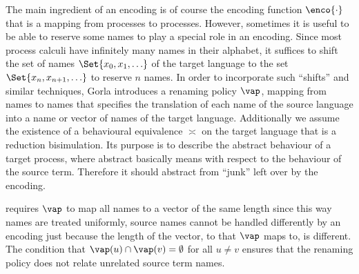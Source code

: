 \documentclass[final,copyright,creativecommons]{eptcs}
\begin{document}
The main ingredient of an encoding is of course the encoding function $ \enco{\cdot} $ that is a mapping from processes to processes.
However, sometimes it is useful to be able to reserve some names to play a special role in an encoding.
Since most process calculi have infinitely many names in their alphabet, it suffices to shift the set of names $ \Set{ x_0, x_1, \ldots } $ of the target language to the set $ \Set{ x_n, x_{n+1}, \ldots } $ to reserve $ n $ names. In order to incorporate such ``shifts'' and similar techniques, Gorla introduces a renaming policy $ \vap $, \ie mapping from names to names that specifies the translation of each name of the source language into a name or vector of names of the target language.
Additionally we assume the existence of a behavioural equivalence $ \asymp $ on the target language that is a reduction bisimulation. Its purpose is to describe the abstract behaviour of a target process, where abstract basically means with respect to the behaviour of the source term. Therefore it should abstract from ``junk'' left over by the encoding.

\cite{gorla} requires $ \vap $ to map all names to a vector of the same length since this way names are treated uniformly, \ie source names cannot be handled differently by an encoding just because the length of the vector, to that $ \vap $ maps to, is different.
The condition that $\vap(u) \cap \vap(v) = \emptyset$ for all $u \neq v$ ensures that the renaming policy does not relate unrelated source term names.
\end{document}
